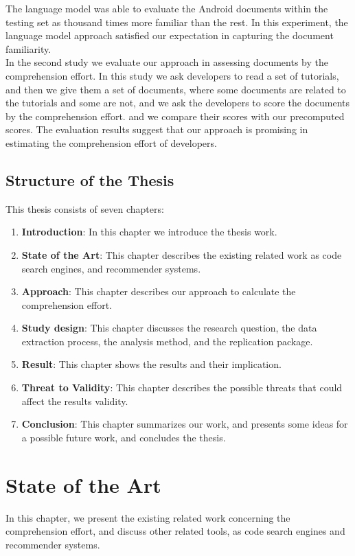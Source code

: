 \documentclass[12pt,mscthesis]{usiinfthesis}
\begin{document}
	 The language model was able to evaluate the Android documents within the testing set as thousand times more familiar than the rest. 
	 In this experiment, the language model approach satisfied our expectation in capturing the document familiarity.\\

	 In the second study we evaluate our approach in assessing documents by the comprehension effort. In this study we ask developers to read a set of tutorials, and then we give them a set of documents, where some documents are related to the tutorials and some are not, and we ask the developers to score the documents by the comprehension effort. and we compare their scores with our precomputed scores. The evaluation results suggest that our approach is promising in estimating the comprehension effort of developers. 


	\section{Structure of the Thesis}
	This thesis consists of seven chapters: 
	\begin{enumerate}
	
		\item \textbf{Introduction}: In this chapter we introduce the thesis work.
		\item \textbf{State of the Art}: This chapter describes the existing related work as code search engines, and recommender systems.
		\item \textbf{Approach}: This chapter describes our approach to calculate the comprehension effort.
		\item \textbf{Study design}: This chapter discusses the research question, the data extraction process, the analysis method, and the replication package.
		\item \textbf{Result}: This chapter shows the results and their implication.
		\item \textbf{Threat to Validity}: This chapter describes the possible threats that could affect the results validity.
		\item \textbf{Conclusion}: This chapter summarizes our work, and presents some ideas for a possible future work, and concludes the thesis.
	\end{enumerate}
\chapter{State of the Art}
	In this chapter, we present the existing related work concerning the comprehension effort, and discuss other related tools, as code search engines and recommender systems.
\end{document}
